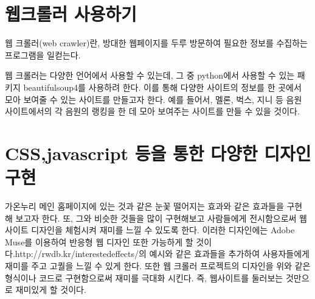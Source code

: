 \documentclass[11pt, a4paper]{article}
\begin{document}
	\section{웹크롤러 사용하기}
	웹 크롤러(web crawler)란, 방대한 웹페이지를 두루 방문하여 필요한 정보를 수집하는 프로그램을 일컫는다.
	
	웹 크롤러는 다양한 언어에서 사용할 수 있는데, 그 중 python에서 사용할 수 있는 패키지 beautifulsoup4를 사용하려 한다. 이를 통해 다양한 사이트의 정보를 한 곳에서 모아 보여줄 수 있는 사이트를 만들고자 한다. 예를 들어서, 멜론, 벅스, 지니 등 음원 사이트에서의 각 음원의 랭킹을 한 데 모아 보여주는 사이트를 만들 수 있을 것이다.
	\section{CSS,javascript 등을 통한 다양한 디자인 구현}
	가온누리 메인 홈페이지에 있는 것과 같은 눈꽃 떨어지는 효과와 같은 효과들을 구현 해 보고자 한다. 또, 그와 비슷한 것들을 많이 구현해보고 사람들에게 전시함으로써 웹사이트 디자인을 체험시켜 재미를 느낄 수 있도록 한다. 이러한 디자인에는 Adobe Muse를 이용하여 반응형 웹 디자인 또한 가능하게 할 것이다.http://rwdb.kr/interestedeffects/의 예시와 같은 효과들을 추가하여 사용자들에게 재미를 주고 고퀄을 느낄 수 있게 한다. 또한 웹 크롤러 프로젝트의 디자인을 위와 같은 형식이나 코드로 구현함으로써 재미를 극대화 시킨다. 즉, 웹사이트를 둘러보는 것만으로 재미있게 할 것이다.
	
\end{document}
